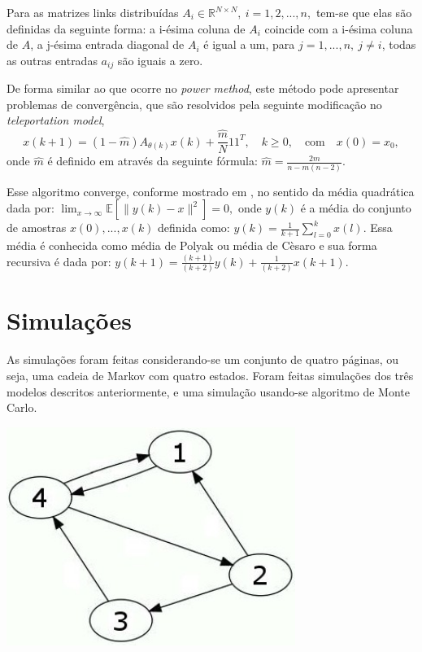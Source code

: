 \documentclass[a0,portrait]{a0poster}
\begin{document}
\begin{multicols}{2}
Para as matrizes links distribu\'idas $A_i \in \mathbb{R}^{N \times N}, \: i = 1,2, ..., n,$ tem-se que elas s\~ao definidas da seguinte forma: a i-\'esima coluna de $A_i$ coincide com a i-\'esima coluna de $A$, a j-\'esima entrada diagonal de $A_i$ \'e igual a um, para $j = 1, ..., n, \: j \neq i$, todas as outras entradas $a_{ij}$ s\~ao iguais a zero.

De forma similar ao que ocorre no \textit{power method}, este m\'etodo pode apresentar problemas de converg\^encia, que s\~ao resolvidos pela seguinte modifica\c{c}\~ao no \textit{teleportation model},
%
\begin{equation}\label{xA}
	x(k+1) = (1 - \hat{m})A_{\theta(k)}x(k) + \frac{\hat{m}}{N}11^T, \quad k \geq 0, \quad \text{com} \quad x(0) = x_0,
\end{equation}
%
onde  $\hat{m}$ \'e definido em atrav\'es da seguinte f\'ormula: $\hat{m} = \frac{2m}{n-m(n-2)}.$

Esse algoritmo converge, conforme mostrado em \cite{ishiiMag14}, no sentido da m\'edia quadr\'atica dada por: $\lim_{x\rightarrow \infty} \mathbb{E} [\parallel y(k)-x \parallel^2] = 0,$ onde $y(k)$ \'e a m\'edia do conjunto de amostras $x(0),... , x(k)$ definida como: $y(k) = \frac{1}{k+1} \sum_{l=0}^{k} x(l).$ Essa m\'edia \'e conhecida como m\'edia de Polyak ou m\'edia de C\`esaro e sua forma recursiva \'e dada por: $y(k+1) = \frac{(k+1)}{(k+2)}y(k) + \frac{1}{(k+2)}x(k+1).$\\[-2em]

\section{Simula\c{c}\~oes}

As simula\c{c}\~oes foram feitas considerando-se um conjunto de quatro p\'aginas, ou seja, uma cadeia de Markov com quatro estados. Foram feitas simula\c{c}\~oes dos tr\^es modelos descritos anteriormente, e uma simula\c{c}\~ao usando-se algoritmo de Monte Carlo.
%
\begin{center}
\includegraphics[width=9.4cm]{graph}
\end{center}


\end{multicols}
\end{document}
